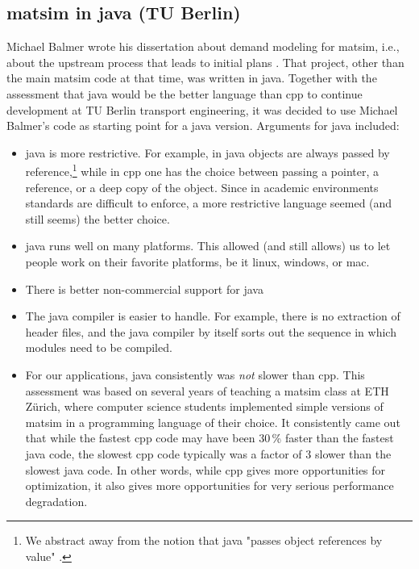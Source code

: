 \subsection{\protect\gls{matsim} in \protect\gls{java} (TU Berlin)}
\label{sec:matsim-in-java}
Michael Balmer wrote his dissertation about demand modeling for \gls{matsim}, i.e., about the upstream process that leads to initial plans
\citep{Balmer2007phd}.  That project, other than the main \gls{matsim} code at that time, was written in \gls{java}.  Together with the assessment that \gls{java} would be the better language than \gls{cpp} to continue development at TU Berlin transport engineering, it was decided to use Michael Balmer's code as starting point for a \gls{java} version.  Arguments for \gls{java} included:
\begin{itemize}

\item  \gls{java} is more restrictive. For example, in \gls{java} objects are always passed by reference,\footnote{%
%
We abstract away from the notion that \gls{java} "passes object references by value" \citep{...}.
%
} while in \gls{cpp} one has the choice between passing a pointer, a reference, or a deep copy of the object.  Since in academic environments standards are difficult to enforce, a more restrictive language seemed (and still seems) the better choice.

\item \gls{java} runs well on many platforms.  This allowed (and still allows) us to let people work on their favorite platforms, be it linux, \gls{windows}, or \gls{mac}.

\item There is better non-commercial support for \gls{java} 

\item The \gls{java} compiler is easier to handle.  For example, there is no extraction of header files, and the \gls{java} compiler by itself sorts out the sequence in which modules need to be compiled.

\item For our applications, \gls{java} consistently was \emph{not} slower than \gls{cpp}.  This assessment was based on several years of teaching a \gls{matsim} class at ETH Zürich, where computer science students implemented simple versions of \gls{matsim} in a programming language of their choice.  It consistently came out that while the fastest \gls{cpp} code may have been 30\,\% faster than the fastest \gls{java} code, the slowest \gls{cpp} code typically was a factor of 3 slower than the slowest \gls{java} code.  In other words, while \gls{cpp} gives more opportunities for optimization, it also gives more opportunities for very serious performance degradation.


\end{itemize}
